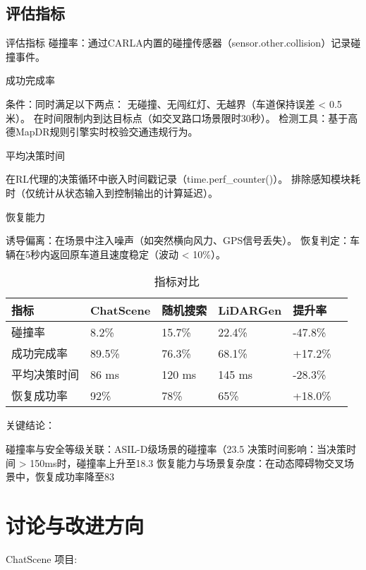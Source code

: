\subsection{评估指标}

评估指标
碰撞率：通过CARLA内置的碰撞传感器（sensor.other.collision）记录碰撞事件。

成功完成率

条件：同时满足以下两点：
无碰撞、无闯红灯、无越界（车道保持误差 < 0.5米）。
在时间限制内到达目标点（如交叉路口场景限时30秒）。
检测工具：基于高德MapDR规则引擎实时校验交通违规行为。

平均决策时间

在RL代理的决策循环中嵌入时间戳记录（time.perf\_counter()）。
排除感知模块耗时（仅统计从状态输入到控制输出的计算延迟）。

恢复能力

诱导偏离：在场景中注入噪声（如突然横向风力、GPS信号丢失）。
恢复判定：车辆在5秒内返回原车道且速度稳定（波动 < 10\%）。


\begin{table}[htb]
	\centering
	\caption{指标对比}
	\label{T.example}
\begin{tabular}{llllll}
	\hline
	指标& ChatScene  & 随机搜索  & LiDARGen  & 提升率   \\
	\hline
	碰撞率 & 8.2\%  & 15.7\% & 22.4\% 	&  -47.8\%	\\
	\hline
	成功完成率 & 89.5\% & 76.3\% & 68.1\% 	& 	 +17.2\%	\\
	\hline
	平均决策时间 & 86 ms & 120 ms & 145 ms&	-28.3\%	\\
	\hline
	恢复成功率 & 92\% & 78\% & 65\%	&  +18.0\%	\\
	
	\hline
\end{tabular}
\end{table}


关键结论：


碰撞率与安全等级关联：ASIL-D级场景的碰撞率（23.5%
决策时间影响：当决策时间 > 150ms时，碰撞率上升至18.3%
恢复能力与场景复杂度：在动态障碍物交叉场景中，恢复成功率降至83%



\section{讨论与改进方向}
ChatScene 项目:


